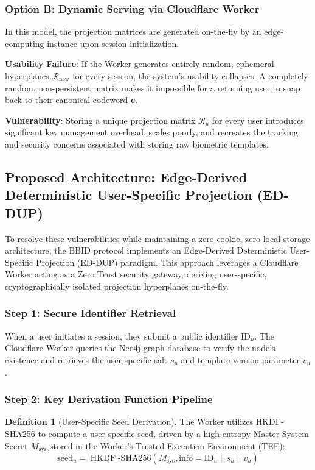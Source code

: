\documentclass[11pt,twoside]{amsart}
\theoremstyle{plain}
\theoremstyle{definition}
\newtheorem{definition}[theorem]{Definition}
\theoremstyle{remark}
\DeclareMathOperator{\HKDF}{HKDF}
\newcommand{\bc}{\mathbf{c}}
\newcommand{\calR}{\mathcal{R}}
\begin{document}
\subsubsection{Option B: Dynamic Serving via Cloudflare Worker}

In this model, the projection matrices are generated on-the-fly by an edge-computing instance upon session initialization.

\textbf{Usability Failure}: If the Worker generates entirely random, ephemeral hyperplanes $\calR_{\text{new}}$ for every session, the system's usability collapses. A completely random, non-persistent matrix makes it impossible for a returning user to snap back to their canonical codeword $\bc$.

\textbf{Vulnerability}: Storing a unique projection matrix $\calR_u$ for every user introduces significant key management overhead, scales poorly, and recreates the tracking and security concerns associated with storing raw biometric templates.

\subsection{Proposed Architecture: Edge-Derived Deterministic User-Specific Projection (ED-DUP)}

To resolve these vulnerabilities while maintaining a zero-cookie, zero-local-storage architecture, the BBID protocol implements an Edge-Derived Deterministic User-Specific Projection (ED-DUP) paradigm. This approach leverages a Cloudflare Worker acting as a Zero Trust security gateway, deriving user-specific, cryptographically isolated projection hyperplanes on-the-fly.

\subsubsection{Step 1: Secure Identifier Retrieval}

When a user initiates a session, they submit a public identifier $\text{ID}_u$. The Cloudflare Worker queries the Neo4j graph database to verify the node's existence and retrieves the user-specific salt $s_u$ and template version parameter $v_u$.

\subsubsection{Step 2: Key Derivation Function Pipeline}

\begin{definition}[User-Specific Seed Derivation]
\label{def:seed}
The Worker utilizes HKDF-SHA256 to compute a user-specific seed, driven by a high-entropy Master System Secret $M_{\text{sys}}$ stored in the Worker's Trusted Execution Environment (TEE):
\begin{equation}
\text{seed}_u = \HKDF\text{-SHA256}(M_{\text{sys}}, \text{info} = \text{ID}_u \| s_u \| v_u)
\end{equation}
\end{definition}
\end{document}
